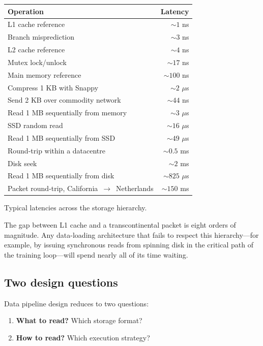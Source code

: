 \documentclass[11pt,a4paper]{article}
\theoremstyle{definition}
\theoremstyle{remark}
\theoremstyle{plain}
\begin{document}
\begin{center}
\renewcommand{\arraystretch}{1.25}
\begin{tabular}{@{}lr@{}}
\toprule
\textbf{Operation} & \textbf{Latency} \\
\midrule
L1 cache reference & $\sim\!1$ ns \\
Branch misprediction & $\sim\!3$ ns \\
L2 cache reference & $\sim\!4$ ns \\
Mutex lock/unlock & $\sim\!17$ ns \\
Main memory reference & $\sim\!100$ ns \\
Compress 1 KB with Snappy & $\sim\!2$ $\mu$s \\
Send 2 KB over commodity network & $\sim\!44$ ns \\
Read 1 MB sequentially from memory & $\sim\!3$ $\mu$s \\
SSD random read & $\sim\!16$ $\mu$s \\
Read 1 MB sequentially from SSD & $\sim\!49$ $\mu$s \\
Round-trip within a datacentre & $\sim\!0.5$ ms \\
Disk seek & $\sim\!2$ ms \\
Read 1 MB sequentially from disk & $\sim\!825$ $\mu$s \\
Packet round-trip, California~$\to$~Netherlands & $\sim\!150$ ms \\
\bottomrule
\end{tabular}
\par\smallskip
{\small Typical latencies across the storage hierarchy.}
\end{center}

The gap between L1 cache and a transcontinental packet is eight orders of
magnitude. Any data-loading architecture that fails to respect this
hierarchy---for example, by issuing synchronous reads from spinning disk
in the critical path of the training loop---will spend nearly all of its
time waiting.

\subsection{Two design questions}

Data pipeline design reduces to two questions:

\begin{enumerate}[leftmargin=1.8em, itemsep=2pt]
    \item \textbf{What to read?} Which storage format?
    \item \textbf{How to read?} Which execution strategy?
\end{enumerate}
\end{document}
